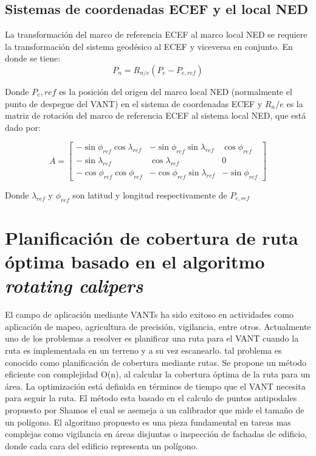 \documentclass[]{report}
\begin{document}
\subsection{Sistemas de coordenadas ECEF y el local NED}
La transformación del marco de referencia ECEF al marco local NED se requiere la transformación del sistema geodésico al ECEF y viceversa en conjunto.
En donde se tiene:
\begin{equation}
P_n = R_{n/e} (P_e - P_{e,ref})
\end{equation}

Donde $P_e,ref$ es la posición del origen del marco local NED (normalmente el punto de despegue del VANT) en el sistema de coordenadas ECEF y $R_n/e$ es la matriz de rotación del marco de referencia ECEF al sistema local NED, que está dado por:

\begin{equation}
A = \begin{bmatrix}
-\sin\phi_{ref} \cos\lambda_{ref} & -\sin\phi_{ref} \sin\lambda_{ref} & \cos\phi_{ref} \\
-\sin \lambda_{ref} & \cos \lambda_{ref} &  0 \\
-\cos\phi_{ref} \cos\phi_{ref} & -\cos\phi_{ref} \sin\lambda_{ref} & -\sin\phi_{ref}
\end{bmatrix}
\end{equation}

Donde $\lambda_{ref}$ y $\phi_{ref}$  son latitud y longitud respectivamente de $P_{e,ref}$


\section {Planificación de cobertura de ruta óptima basado en el algoritmo \textit{rotating calipers}}
El campo de aplicación mediante VANTs ha sido exitoso en actividades como aplicación de mapeo, agricultura de precisión, vigilancia, entre otros. Actualmente uno de los problemas a resolver es planificar una ruta para el VANT cuando la ruta es implementada en un terreno y a su vez escanearlo. tal problema es conocido como planificación de cobertura mediante rutas.
Se propone un método eficiente con complejidad O(n), al calcular la cobertura óptima de la ruta para un área. La optimización está definida en términos de tiempo que el VANT necesita para seguir la ruta. El método esta basado en el calculo de puntos antipodales propuesto por Shamos \cite{shamos1978} el cual se asemeja a un calibrador que mide el tamaño de un polígono. El algoritmo propuesto es una pieza fundamental en tareas mas complejas como vigilancia en áreas disjuntas o inspección de fachadas de edificio, donde cada cara del edificio representa un polígono.
\end{document}
